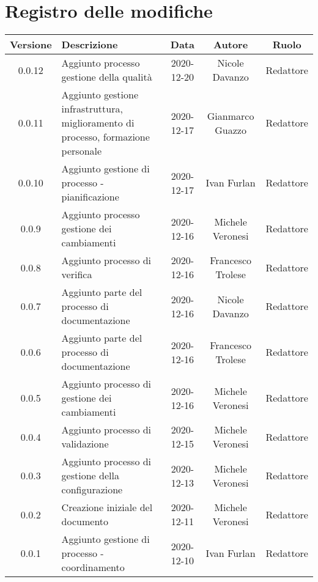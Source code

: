 \section*{Registro delle modifiche}

\begin{center}
	\begin{longtable}{|c|p{5cm}|c|c|c|}
	\hline
	\rowcolor{lighter-grayer}
	\textbf{Versione} & \textbf{Descrizione} & \textbf{Data} & \textbf{Autore} & \textbf{Ruolo} \\
	\hline
	\endfirsthead


	\hline
	0.0.12 & Aggiunto processo gestione della qualità & 2020-12-20 & Nicole Davanzo & Redattore \\
	0.0.11 & Aggiunto gestione infrastruttura, miglioramento di processo, formazione personale & 2020-12-17 & Gianmarco Guazzo & Redattore \\
	0.0.10 & Aggiunto gestione di processo - pianificazione & 2020-12-17 & Ivan Furlan & Redattore \\
	0.0.9 & Aggiunto processo gestione dei cambiamenti & 2020-12-16 & Michele Veronesi & Redattore \\
	0.0.8 & Aggiunto processo di verifica & 2020-12-16 & Francesco Trolese & Redattore \\
	0.0.7 & Aggiunto parte del processo di documentazione & 2020-12-16 & Nicole Davanzo & Redattore \\
	0.0.6 & Aggiunto parte del processo di documentazione & 2020-12-16 & Francesco Trolese & Redattore \\
	0.0.5 & Aggiunto processo di gestione dei cambiamenti & 2020-12-16 & Michele Veronesi & Redattore \\
	0.0.4 & Aggiunto processo di validazione & 2020-12-15 & Michele Veronesi & Redattore \\
	0.0.3 & Aggiunto processo di gestione della configurazione & 2020-12-13 & Michele Veronesi & Redattore \\
	0.0.2 & Creazione iniziale del documento & 2020-12-11 & Michele Veronesi & Redattore \\
	0.0.1 & Aggiunto gestione di processo - coordinamento & 2020-12-10 & Ivan Furlan & Redattore \\

	\hline

	\end{longtable}
\end{center}